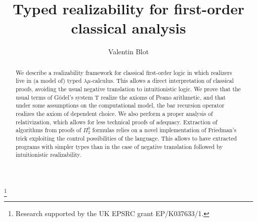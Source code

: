 \documentclass{CSML}
\begin{document}
\title{Typed realizability for first-order classical analysis}
\author{Valentin Blot}
\address{Department of Computer Science, University of Bath, United Kingdom}
\thanks{Research supported by the UK EPSRC grant EP/K037633/1.}
\begin{abstract}
We describe a realizability framework for classical first-order logic in which realizers live in (a model of) typed $\lambda\mu$-calculus. This allows a direct interpretation of classical proofs, avoiding the usual negative translation to intuitionistic logic. We prove that the usual terms of G\"odel's system T realize the axioms of Peano arithmetic, and that under some assumptions on the computational model, the bar recursion operator realizes the axiom of dependent choice. We also perform a proper analysis of relativization, which allows for less technical proofs of adequacy. Extraction of algorithms from proofs of $\Pi^0_2$ formulas relies on a novel implementation of Friedman's trick exploiting the control possibilities of the language. This allows to have extracted programs with simpler types than in the case of negative translation followed by intuitionistic realizability.
\end{abstract}
\maketitle
\end{document}
